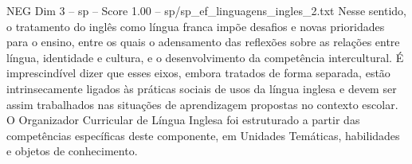 \begin{textsample}{NEG Dim 3 – sp – Score 1.00 – sp/sp\_ef\_linguagens\_ingles\_2.txt}
Nesse sentido, o tratamento do inglês como língua franca impõe desafios e novas prioridades para o ensino, entre os quais o adensamento das reflexões sobre as relações entre língua, identidade e cultura, e o desenvolvimento da competência intercultural.
É imprescindível dizer que esses eixos, embora tratados de forma separada, estão intrinsecamente ligados às práticas sociais de usos da língua inglesa e devem ser assim trabalhados nas situações de aprendizagem propostas no contexto escolar.
O Organizador Curricular de Língua Inglesa foi estruturado a partir das competências específicas deste componente, em Unidades Temáticas, habilidades e objetos de conhecimento.

\end{textsample}
